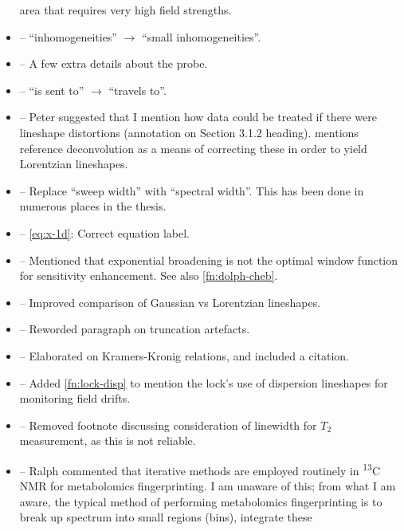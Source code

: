 \documentclass[12pt]{article}
\begin{document}
\begin{itemize}
            area that requires very high field strengths.
        \item {} -- ``inhomogeneities''
            $\rightarrow$ ``small inhomogeneities''.
        \item {} -- A few extra details about the probe.
        \item {} -- ``is sent to'' $\rightarrow$ ``travels to''.
        \item {} -- Peter suggested that I mention how
            data could be treated if there were lineshape distortions
            (annotation on Section 3.1.2 heading).  mentions
            reference deconvolution as a means of correcting these in order to
            yield Lorentzian lineshapes.
        \item {} -- Replace ``sweep width'' with ``spectral
            width''. This has been done in numerous places in the thesis.
        \item {} -- \cref{eq:x-1d}: Correct equation label.
        \item {} -- Mentioned that exponential broadening
            is not the optimal window function for sensitivity enhancement. See
            also \cref{fn:dolph-cheb}.
        \item {} -- Improved comparison of Gaussian vs
            Lorentzian lineshapes.
        \item {} -- Reworded paragraph on truncation artefacts.
        \item {} -- Elaborated on Kramers-Kronig
            relations, and included a citation.
        \item {} -- Added \cref{fn:lock-disp} to mention
            the lock's use of dispersion lineshapes for monitoring field
            drifts.
        \item {} -- Removed footnote discussing
            consideration of linewidth for $T_2$ measurement, as this is not
            reliable.
        \item {} -- Ralph commented that iterative methods
            are employed routinely in \textsuperscript{13}C NMR for
            metabolomics fingerprinting. I am unaware of this; from what I am
            aware, the typical method of performing metabolomics fingerprinting
            is to break up spectrum into small regions (bins), integrate these

\end{itemize}
\end{document}
